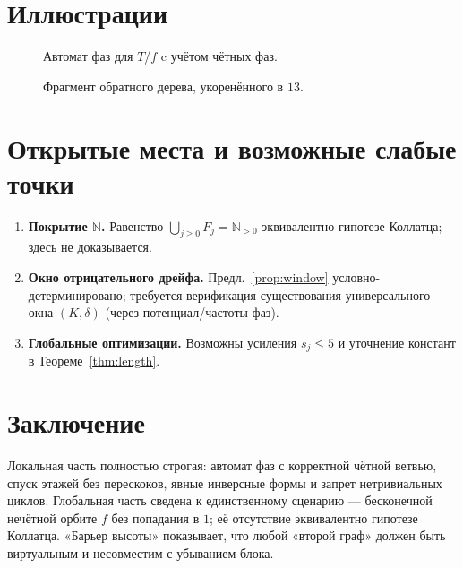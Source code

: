 \documentclass[a4paper,12pt]{article}
\theoremstyle{plain}
\theoremstyle{definition}
\begin{document}
\section{Иллюстрации}\label{sec:figs}
\begin{figure}[h]
\centering
{}
\caption{Автомат фаз для $T$/$f$ c учётом чётных фаз.}
\end{figure}

\begin{figure}[h]
\centering
{}
\caption{Фрагмент обратного дерева, укоренённого в $13$.}
\end{figure}

\section{Открытые места и возможные слабые точки}\label{sec:weak}
\begin{enumerate}[leftmargin=2.2em]
\item \textbf{Покрытие $\mathbb N$.} Равенство $\bigcup_{j\ge0}F_j=\mathbb N_{>0}$ эквивалентно гипотезе Коллатца; здесь не доказывается.
\item \textbf{Окно отрицательного дрейфа.} Предл.~\ref{prop:window} условно-детерминировано; требуется верификация существования универсального окна $(K,\delta)$ (через потенциал/частоты фаз).
\item \textbf{Глобальные оптимизации.} Возможны усиления $s_j\le5$ и уточнение констант в Теореме~\ref{thm:length}.
\end{enumerate}

\section{Заключение}
Локальная часть полностью строгая: автомат фаз с корректной чётной ветвью, спуск этажей без перескоков, явные инверсные формы и запрет нетривиальных циклов. 
Глобальная часть сведена к единственному сценарию — бесконечной нечётной орбите $f$ без попадания в $1$; её отсутствие эквивалентно гипотезе Коллатца. 
«Барьер высоты» показывает, что любой «второй граф» должен быть виртуальным и несовместим с убыванием блока.
\end{document}

